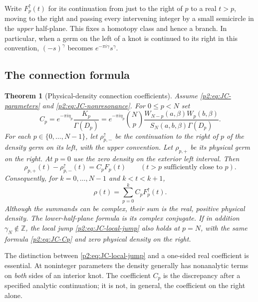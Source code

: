 \documentclass[11pt,a4paper]{article}
\newtheorem{theorem}{Theorem}[section]
\theoremstyle{definition}
\theoremstyle{remark}
\numberwithin{equation}{section}
\begin{document}
Write $F_p^{\uparrow}(t)$ for its continuation from just to the right
of $p$ to a real $t>p$, moving to the right and passing every intervening
integer by a small semicircle in the \emph{upper} half-plane.  This
fixes a homotopy class and hence a branch.  In particular, when a germ
on the left of a knot is continued to its right in this convention,
$(-s)^\gamma$ becomes $e^{-\pi i\gamma}s^\gamma$.

\subsection{The connection formula}

\begin{theorem}[Physical-density connection coefficients]
\label{p2:thm:JC-connection}
Assume \eqref{p2:eq:JC-parameters} and \eqref{p2:eq:JC-nonresonance}.
For $0\le p<N$ set
\begin{equation}\label{p2:eq:JC-Cp}
 \boxed{\displaystyle
 C_p=e^{-\pi i\eta_p}\frac{K_p}{\Gamma(D_p)}
 =e^{-\pi i\eta_p}\binom Np
 \frac{W_{N-p}(a,\beta)W_p(b,\beta)}
      {S_N(a,b,\beta)\Gamma(D_p)}.}
\end{equation}
For each $p\in\{0,\ldots,N-1\}$, let
$\rho_{p,-}^{\uparrow}$ be the continuation to the right of
$p$ of the density germ on its left, with the upper convention.
Let $\rho_{p,+}$ be its physical germ on the right.  At $p=0$
use the zero density on the exterior left interval.  Then
\begin{equation}\label{p2:eq:JC-local-jump}
 \rho_{p,+}(t)-\rho_{p,-}^{\uparrow}(t)=C_pF_p(t)
 \qquad(t>p\text{ sufficiently close to }p).
\end{equation}
Consequently, for $k=0,\ldots,N-1$ and $k<t<k+1$,
\begin{equation}\label{p2:eq:JC-global}
 \boxed{\displaystyle
 \rho(t)=\sum_{p=0}^{k}C_pF_p^{\uparrow}(t).}
\end{equation}
Although the summands can be complex, their sum is the real, positive
physical density.  The lower-half-plane formula is its complex conjugate.
If in addition $\gamma_N\notin\mathbb Z$, the local jump
\eqref{p2:eq:JC-local-jump} also holds at $p=N$, with the same formula
\eqref{p2:eq:JC-Cp} and zero physical density on the right.
\end{theorem}

The distinction between \eqref{p2:eq:JC-local-jump} and a one-sided real
coefficient is essential.  At noninteger parameters the density generally
has nonanalytic terms on \emph{both} sides of an interior knot.  The
coefficient $C_p$ is the discrepancy after a specified analytic
continuation; it is not, in general, the coefficient on the right alone.
\end{document}
